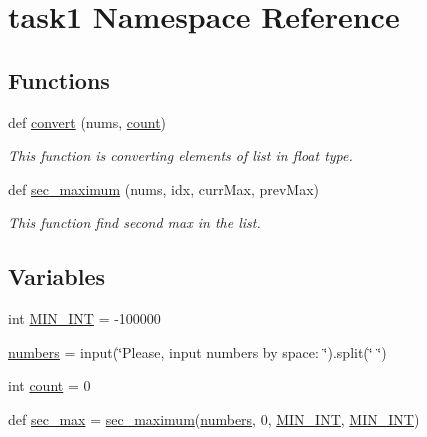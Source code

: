 \hypertarget{namespacetask1}{}\section{task1 Namespace Reference}
\label{namespacetask1}
\subsection*{Functions}
\begin{DoxyCompactItemize}
\item 
def \hyperlink{namespacetask1_add03bb5f88d4697c6bd0279a4b98ffb0}{convert} (nums, \hyperlink{namespacetask1_ad545b778d609aa4fd7261bb35587546a}{count})
\begin{DoxyCompactList}\small\item\em This function is converting elements of list in float type. \end{DoxyCompactList}\item 
def \hyperlink{namespacetask1_a4a5a08378d4ee5b9ee7ae4562c950029}{sec\+\_\+maximum} (nums, idx, curr\+Max, prev\+Max)
\begin{DoxyCompactList}\small\item\em This function find second max in the list. \end{DoxyCompactList}\end{DoxyCompactItemize}
\subsection*{Variables}
\begin{DoxyCompactItemize}
\item 
int \hyperlink{namespacetask1_a0221130f97a54b7681577191e87653d9}{M\+I\+N\+\_\+\+I\+NT} = -\/100000
\item 
\hyperlink{namespacetask1_a0272177a25c59aef422644e1b7fcc098}{numbers} = input(\char`\"{}Please, input numbers by space\+: \char`\"{}).split(\char`\"{} \char`\"{})
\item 
int \hyperlink{namespacetask1_ad545b778d609aa4fd7261bb35587546a}{count} = 0
\item 
def \hyperlink{namespacetask1_a4aa8290096a4764232477c95e630a6be}{sec\+\_\+max} = \hyperlink{namespacetask1_a4a5a08378d4ee5b9ee7ae4562c950029}{sec\+\_\+maximum}(\hyperlink{namespacetask1_a0272177a25c59aef422644e1b7fcc098}{numbers}, 0, \hyperlink{namespacetask1_a0221130f97a54b7681577191e87653d9}{M\+I\+N\+\_\+\+I\+NT}, \hyperlink{namespacetask1_a0221130f97a54b7681577191e87653d9}{M\+I\+N\+\_\+\+I\+NT})
\end{DoxyCompactItemize}


